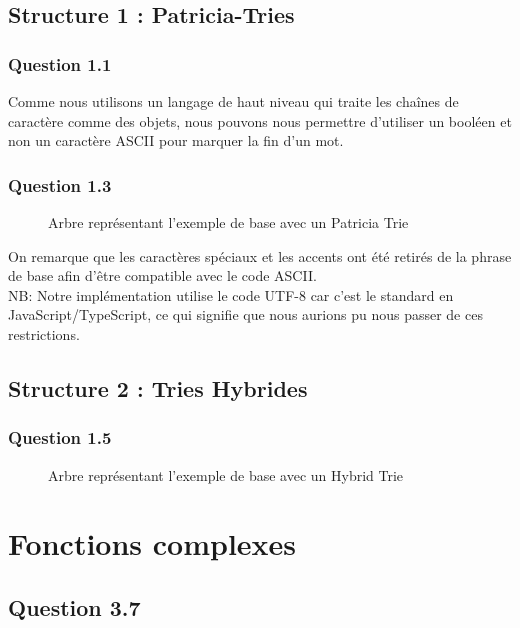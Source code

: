 \documentclass[11pt]{rapport-algav}
\begin{document}
\section{Structure 1 : Patricia-Tries}
\subsection{Question 1.1}
Comme nous utilisons un langage de haut niveau qui traite les chaînes de caractère comme des objets, nous pouvons nous permettre d'utiliser un booléen et non un caractère ASCII pour marquer la fin d'un mot.
\subsection{Question 1.3}
\begin{figure}[ht!]
			\centering
			\caption{Arbre représentant l'exemple de base avec un Patricia Trie}
			\label{fig:exemple_pat}
\end{figure}

On remarque que les caractères spéciaux et les accents ont été retirés de la phrase de base afin d'être compatible avec le code ASCII.\\
NB: Notre implémentation utilise le code UTF-8 car c'est le standard en JavaScript/TypeScript, ce qui signifie que nous aurions pu nous passer de ces restrictions.
\newpage
\section{Structure 2 : Tries Hybrides}
\subsection{Question 1.5}
\begin{figure}[ht!]
		\centering
		\caption{Arbre représentant l'exemple de base avec un Hybrid Trie}
		\label{fig:exemple_hyb}
	\end{figure}

\newpage  %
\chapter{Fonctions complexes}
\section{Question 3.7}
\end{document}
